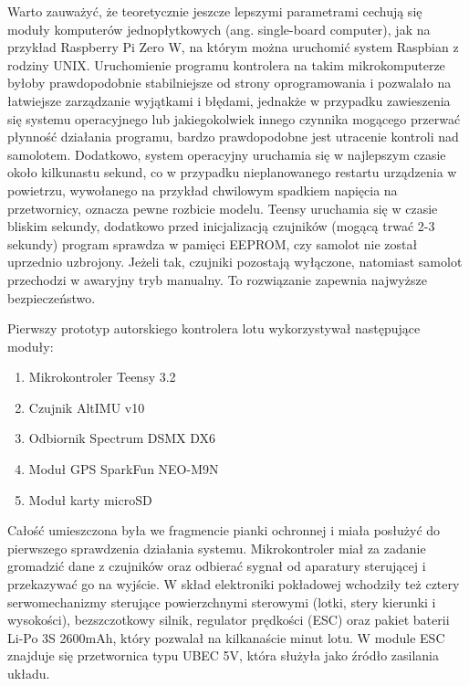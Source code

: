 \documentclass[12pt, a4paper]{article}
\begin{document}
Warto zauważyć, że teoretycznie jeszcze lepszymi parametrami cechują się moduły komputerów jednopłytkowych (ang. single-board computer), jak na przykład Raspberry Pi Zero W, na którym można uruchomić system Raspbian z rodziny UNIX. Uruchomienie programu kontrolera na takim mikrokomputerze byłoby prawdopodobnie stabilniejsze od strony oprogramowania i pozwalało na łatwiejsze zarządzanie wyjątkami i błędami, jednakże w przypadku zawieszenia się systemu operacyjnego lub jakiegokolwiek innego czynnika mogącego przerwać płynność działania programu, bardzo prawdopodobne jest utracenie kontroli nad samolotem. Dodatkowo, system operacyjny uruchamia się w najlepszym czasie około kilkunastu sekund, co w przypadku nieplanowanego restartu urządzenia w powietrzu, wywołanego na przykład chwilowym spadkiem napięcia na przetwornicy, oznacza pewne rozbicie modelu. Teensy uruchamia się w czasie bliskim sekundy, dodatkowo przed inicjalizacją czujników (mogącą trwać 2-3 sekundy) program sprawdza w pamięci EEPROM, czy samolot nie został uprzednio uzbrojony. Jeżeli tak, czujniki pozostają wyłączone, natomiast samolot przechodzi w awaryjny tryb manualny. To rozwiązanie zapewnia najwyższe bezpieczeństwo.

Pierwszy prototyp autorskiego kontrolera lotu wykorzystywał następujące moduły:
\begin{enumerate}
\item Mikrokontroler Teensy 3.2
\item Czujnik AltIMU v10
\item Odbiornik Spectrum DSMX DX6
\item Moduł GPS SparkFun NEO-M9N
\item Moduł karty microSD
\end{enumerate}

Całość umieszczona była we fragmencie pianki ochronnej i miała posłużyć do pierwszego sprawdzenia działania systemu. Mikrokontroler miał za zadanie gromadzić dane z czujników oraz odbierać sygnał od aparatury sterującej i przekazywać go na wyjście. W skład elektroniki pokładowej wchodziły też cztery serwomechanizmy sterujące powierzchnymi sterowymi (lotki, stery kierunki i wysokości), bezszczotkowy silnik, regulator prędkości (ESC) oraz pakiet baterii Li-Po 3S 2600mAh, który pozwalał na kilkanaście minut lotu. W module ESC znajduje się przetwornica typu UBEC 5V, która służyła jako źródło zasilania układu.
 
\end{document}

